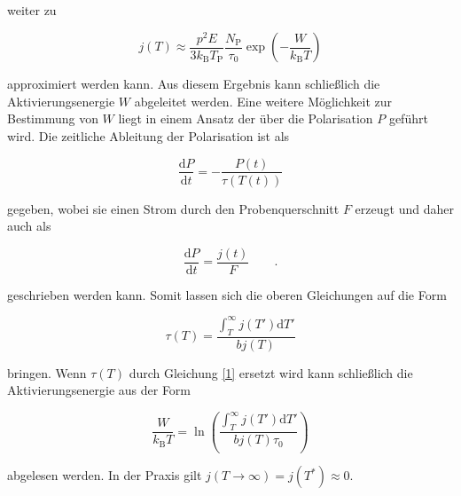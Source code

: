 weiter zu 

\begin{equation}
    j(T) \approx \frac{ p^{2} E }{ 3 k_{\mathrm{B}} T_{\mathrm{P} }} \frac{ N_{\mathrm{P}} }{ \tau_{\text{0}} } \exp{ \left( - \frac{ W }{ k_{\mathrm{B}} T} \right ) }
    \label{eq2}
\end{equation}

approximiert werden kann.
Aus diesem Ergebnis kann schließlich die Aktivierungsenergie $W$ abgeleitet werden.
Eine weitere Möglichkeit zur Bestimmung von $W$ liegt in einem Ansatz der über 
die Polarisation $P$ geführt wird.
Die zeitliche Ableitung der Polarisation ist als

\begin{equation*}
    \frac{\mathrm{d}P}{\mathrm{d}t} = - \frac{ P(t) }{ \tau(T(t))}
\end{equation*}

gegeben, wobei sie einen Strom durch den Probenquerschnitt $F$ erzeugt und daher auch als

\begin{equation*}
    \frac{\mathrm{d}P}{\mathrm{d}t} = \frac{j(t)}{F} \qquad.
\end{equation*}

geschrieben werden kann.
Somit lassen sich die oberen Gleichungen auf die Form 

\begin{equation*}
    \tau(T) = \frac{ \int_{T}^\infty j(T') \mathrm{d}T' }{ b j(T) } 
\end{equation*}

bringen. Wenn $\tau(T)$ durch Gleichung \eqref{1} ersetzt wird kann 
schließlich die Aktivierungsenergie aus der Form 

\begin{equation}
    \frac{ W }{ k_{\mathrm{B}} T } = \ln{ \left( \frac{ \int_{T}^\infty j(T') \mathrm{d}T' }{ b j(T) \tau_{\text{0}} } \right) }
    \label{eq3}
\end{equation}

abgelesen werden. In der Praxis gilt
$j(T \to \infty) = j(T^*)  \approx 0$.

\cite{sample}
